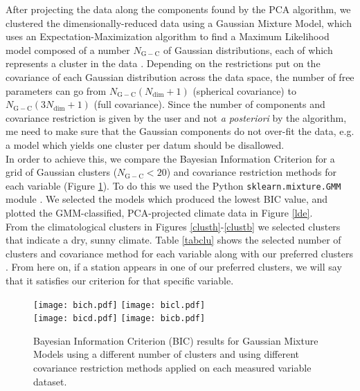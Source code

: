 \documentclass[12pt]{iopart}
\begin{document}
After projecting the data along the components found by the PCA algorithm, we clustered the dimensionally-reduced data using a Gaussian Mixture Model, which uses an Expectation-Maximization algorithm to find a Maximum Likelihood model composed of a number $N_\mathrm{G-C}$ of Gaussian distributions, each of which represents a cluster in the data \cite{gmm}. Depending on the restrictions put on the covariance of each Gaussian distribution across the data space, the number of free parameters can go from $N_\mathrm{G-C}(N_\mathrm{dim}+1)$ (spherical covariance) to  $N_\mathrm{G-C}(3N_\mathrm{dim}+1)$ (full covariance). Since the number of components and covariance restriction is given by the user and not \emph{a posteriori} by the algorithm, me need to make sure that the Gaussian components do not over-fit the data, e.g. a model which yields one cluster per datum should be disallowed.\\

In order to achieve this, we compare the Bayesian Information Criterion \cite{bicref} for a grid of Gaussian clusters ($N_\mathrm{G-C}<20$) and covariance restriction methods for each variable (Figure \ref{bic}). To do this we used the Python \texttt{sklearn.mixture.GMM} module \cite{sklearn}. We selected the models which produced the lowest BIC value, and plotted the GMM-classified, PCA-projected climate data in Figure \ref{lde}. \\

From the climatological clusters in Figures \ref{clusth}-\ref{clustb} we selected clusters that indicate a dry, sunny climate. Table \ref{tabclu} shows the selected number of clusters and covariance method for each variable along with our preferred clusters . From here on, if a station appears in one of our preferred clusters, we will say that it satisfies our criterion for that specific variable.\\

\begin{figure}
\begin{center}
\texttt{[image: bich.pdf]}
\texttt{[image: bicl.pdf]}\\
\texttt{[image: bicd.pdf]}
\texttt{[image: bicb.pdf]}
\caption{Bayesian Information Criterion (BIC) results for Gaussian Mixture Models using a different number of clusters and using different covariance restriction methods applied on each measured variable dataset.}\label{bic}
\end{center}
\end{figure}
\end{document}
